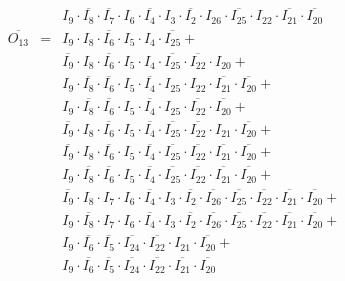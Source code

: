 \documentclass[a4paper,russian]{report}
\begin{document}
\begin{eqnarray*}
	& &  I_{9} \cdotp \overline{I_{8}} \cdotp \overline{I_{7}} \cdotp I_{6} \cdotp \overline{I_{4}} \cdotp I_{3} \cdotp \overline{I_{2}} \cdotp I_{26} \cdotp \overline{I_{25}} \cdotp I_{22} \cdotp \overline{I_{21}} \cdotp \overline{I_{20}} \\
    \overline{O_{13}} & = & I_{9} \cdotp I_{8} \cdotp \overline{I_{6}} \cdotp I_{5} \cdotp I_{4} \cdotp \overline{I_{25}} + \\
	& &  \overline{I_{9}} \cdotp I_{8} \cdotp \overline{I_{6}} \cdotp I_{5} \cdotp I_{4} \cdotp \overline{I_{25}} \cdotp \overline{I_{22}} \cdotp I_{20} + \\
	& &  I_{9} \cdotp \overline{I_{8}} \cdotp \overline{I_{6}} \cdotp I_{5} \cdotp \overline{I_{4}} \cdotp I_{25} \cdotp I_{22} \cdotp \overline{I_{21}} \cdotp \overline{I_{20}} + \\
	& &  I_{9} \cdotp \overline{I_{8}} \cdotp \overline{I_{6}} \cdotp I_{5} \cdotp \overline{I_{4}} \cdotp I_{25} \cdotp \overline{I_{22}} \cdotp \overline{I_{20}} + \\
	& &  \overline{I_{9}} \cdotp I_{8} \cdotp \overline{I_{6}} \cdotp I_{5} \cdotp \overline{I_{4}} \cdotp \overline{I_{25}} \cdotp \overline{I_{22}} \cdotp I_{21} \cdotp \overline{I_{20}} + \\
	& &  \overline{I_{9}} \cdotp I_{8} \cdotp \overline{I_{6}} \cdotp I_{5} \cdotp \overline{I_{4}} \cdotp \overline{I_{25}} \cdotp \overline{I_{22}} \cdotp \overline{I_{21}} \cdotp \overline{I_{20}} + \\
	& &  I_{9} \cdotp \overline{I_{8}} \cdotp \overline{I_{6}} \cdotp I_{5} \cdotp \overline{I_{4}} \cdotp \overline{I_{25}} \cdotp \overline{I_{22}} \cdotp \overline{I_{21}} \cdotp \overline{I_{20}} + \\
	& &  \overline{I_{9}} \cdotp I_{8} \cdotp I_{7} \cdotp I_{6} \cdotp \overline{I_{4}} \cdotp I_{3} \cdotp \overline{I_{2}} \cdotp \overline{I_{26}} \cdotp \overline{I_{25}} \cdotp \overline{I_{22}} \cdotp \overline{I_{21}} \cdotp \overline{I_{20}} + \\
	& &  I_{9} \cdotp \overline{I_{8}} \cdotp I_{7} \cdotp I_{6} \cdotp \overline{I_{4}} \cdotp I_{3} \cdotp \overline{I_{2}} \cdotp \overline{I_{26}} \cdotp \overline{I_{25}} \cdotp \overline{I_{22}} \cdotp \overline{I_{21}} \cdotp \overline{I_{20}} + \\
	& &  I_{9} \cdotp \overline{I_{6}} \cdotp \overline{I_{5}} \cdotp \overline{I_{24}} \cdotp \overline{I_{22}} \cdotp I_{21} \cdotp \overline{I_{20}} + \\
	& &  I_{9} \cdotp \overline{I_{6}} \cdotp \overline{I_{5}} \cdotp \overline{I_{24}} \cdotp \overline{I_{22}} \cdotp \overline{I_{21}} \cdotp \overline{I_{20}} \\
 \end{eqnarray*}
\end{document}
